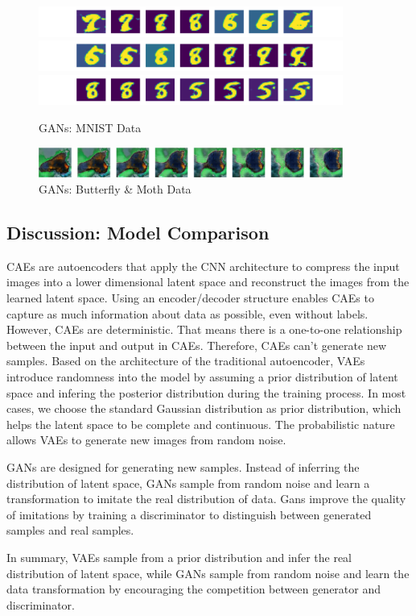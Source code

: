 \documentclass{article}
\begin{document}
\begin{figure}[!ht]
    \centering
    \includegraphics[width=10cm, height=1cm]{./fig/gan-1.png}
    \includegraphics[width=10cm, height=1cm]{./fig/gan-2.png}
    \includegraphics[width=10cm, height=1cm]{./fig/gan-3.png}
    \caption{GANs: MNIST Data}
    \label{fig:gan-mnist}
\end{figure}
\begin{figure}[!ht]
    \centering
    \includegraphics[width=10cm, height=1cm]{./fig/gan-bm.png}
    \caption{GANs: Butterfly \& Moth Data}
    \label{fig:gan-bm}
\end{figure}

\subsection{Discussion: Model Comparison}
CAEs are autoencoders that apply the CNN architecture to compress the input images into a lower dimensional latent space and reconstruct the images from the learned latent space. Using an encoder/decoder structure enables CAEs to capture as much information about data as possible, even without labels. However, CAEs are deterministic. That means there is a one-to-one relationship between the input and output in CAEs. Therefore, CAEs can't generate new samples. Based on the architecture of the traditional autoencoder, VAEs introduce randomness into the model by assuming a prior distribution of latent space and infering the posterior distribution during the training process. In most cases, we choose the standard Gaussian distribution as prior distribution, which helps the latent space to be complete and continuous. The probabilistic nature allows VAEs to generate new images from random noise.\par
GANs are designed for generating new samples. Instead of inferring the distribution of latent space, GANs sample from random noise and learn a transformation to imitate the real distribution of data. Gans improve the quality of imitations by training a discriminator to distinguish between generated samples and real samples.\par
In summary, VAEs sample from a prior distribution and infer the real distribution of latent space, while GANs sample from random noise and learn the data transformation by encouraging the competition between generator and discriminator.
\end{document}
